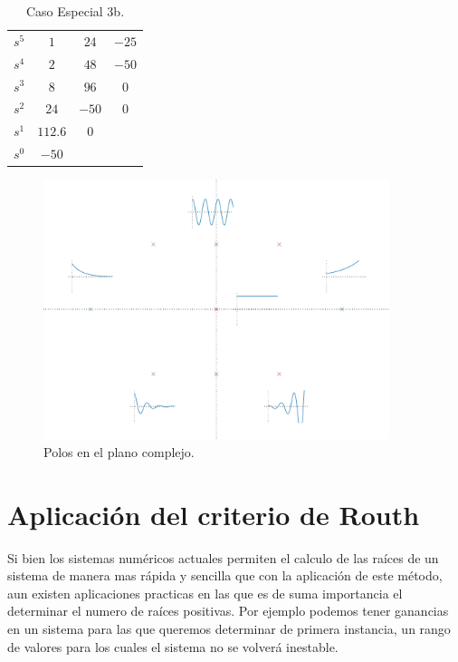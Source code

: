 \begin{enumerate}
            \begin{table}[htbp]
                \centering
                \begin{tabular}{c|c c c}
                $s^5$ & $1$ & $24$ & $-25$ \\
                $s^4$ & $2$ & $48$ & $-50$ \\
                $s^3$ & $8$ & $96$ & $0$   \\
                $s^2$ & $24$ & $-50$ & $0$ \\
                $s^1$ & $112.6$ & $0$ \\
                $s^0$ & $-50$
                \end{tabular}
                \caption{\label{tab:Caso3b}Caso Especial 3b.}
            \end{table}

        \end{enumerate}

        \begin{figure}
            \centering
            \includegraphics[width=0.9\textwidth]{./imagenes/planocomplejo.pdf}
            \caption{\label{fig:planocomplejo}Polos en el plano complejo.}
        \end{figure}

    \newpage
    \section{Aplicación del criterio de Routh}
        Si bien los sistemas numéricos actuales permiten el calculo de las raíces de un sistema de manera mas rápida y sencilla que con la aplicación de este método, aun existen aplicaciones practicas en las que es de suma importancia el determinar el numero de raíces positivas. Por ejemplo podemos tener ganancias en un sistema para las que queremos determinar de primera instancia, un rango de valores para los cuales el sistema no se volverá inestable.


